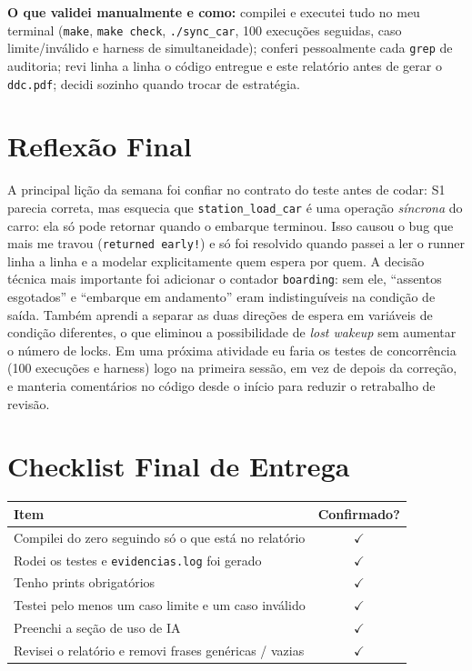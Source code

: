 \documentclass[11pt,a4paper]{article}
\begin{document}
\textbf{O que validei manualmente e como:} compilei e executei tudo no meu
terminal (\texttt{make}, \texttt{make check}, \texttt{./sync\_car}, 100
execuções seguidas, caso limite/inválido e harness de simultaneidade); conferi
pessoalmente cada \texttt{grep} de auditoria; revi linha a linha o código
entregue e este relatório antes de gerar o \texttt{ddc.pdf}; decidi sozinho
quando trocar de estratégia.

\section{Reflexão Final}

A principal lição da semana foi confiar no contrato do teste antes de codar:
S1 parecia correta, mas esquecia que \texttt{station\_load\_car} é uma operação
\emph{síncrona} do
carro: ela só pode retornar quando o embarque terminou. Isso causou o bug que
mais me travou (\texttt{returned early!}) e só foi resolvido quando passei a
ler o runner linha a linha e a modelar explicitamente quem espera por quem. A
decisão técnica mais importante foi adicionar o contador \texttt{boarding}:
sem ele, ``assentos esgotados'' e ``embarque em andamento'' eram indistinguíveis
na condição de saída. Também aprendi a separar as duas direções de espera em
variáveis de condição diferentes, o que eliminou a possibilidade de
\emph{lost wakeup} sem aumentar o número de locks. Em uma próxima atividade eu
faria os testes de concorrência (100 execuções e harness) logo na primeira
sessão, em vez de depois da correção, e manteria comentários no código desde o
início para reduzir o retrabalho de revisão.

\section{Checklist Final de Entrega}

\noindent\begin{tabularx}{\textwidth}{Y c}
\toprule
\textbf{Item} & \textbf{Confirmado?} \\
\midrule
Compilei do zero seguindo só o que está no relatório & $\checkmark$ \\
Rodei os testes e \texttt{evidencias.log} foi gerado & $\checkmark$ \\
Tenho prints obrigatórios & $\checkmark$ \\
Testei pelo menos um caso limite e um caso inválido & $\checkmark$ \\
Preenchi a seção de uso de IA & $\checkmark$ \\
Revisei o relatório e removi frases genéricas / vazias & $\checkmark$ \\
\bottomrule
\end{tabularx}
\end{document}
